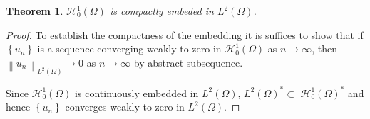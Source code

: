 \documentclass[11pt]{article}
\newtheorem{theorem}{Theorem}[section]
\numberwithin{equation}{section}
\def\Om{\Omega}
\def\mcH{\mathcal{H}}
\begin{document}
		\begin{theorem}\label{compactembed}
			$\mcH_0^1(\Omega)$ is compactly embeded in $L^2(\Omega)$.
		\end{theorem}
		\begin{proof}
			To establish the compactness of the embedding it is suffices to show that if $\left\{ u_n\right\}$ is a sequence converging weakly to  zero in $\mcH_0^1(\Om)$ as $n \rightarrow \infty$, then $\left\| u_n\right\|_{L^2(\Om)} \rightarrow 0$ as $n \rightarrow \infty$  by abstract subsequence.
			
			Since $\mcH_0^1(\Om)$ is continuously embedded in $L^2(\Omega)$, $L^2(\Omega)^* \subset$ $\mcH_0^1(\Om)^*$ and hence $\left\{ u_n\right\}$ converges weakly to zero in $L^2(\Omega)$.
			
			
			
			
			
			
			
			
			

\end{proof}
\end{document}
